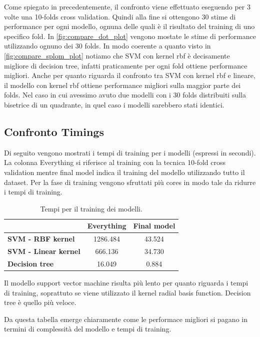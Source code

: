 Come spiegato in precedentemente, il confronto viene effettuato
eseguendo per 3 volte una 10-folds cross validation. Quindi alla fine
si ottengono 30 stime di performance per ogni modello, ognuna delle
quali è il risultato del training di uno specifico fold. In
\autoref{fig:compare_dot_plot} vengono mostate le stime di performance
utilizzando ognuno dei 30 folds. In modo coerente a quanto visto in
\autoref{fig:compare_splom_plot} notiamo che SVM con kernel rbf è
decisamente migliore di decision tree, infatti praticamente per ogni
fold ottiene performance migliori. Anche per quanto riguarda il
confronto tra SVM con kernel rbf e lineare, il modello con kernel rbf
ottiene performance migliori sulla maggior parte dei folds. Nel caso
in cui avessimo avuto due modelli con i 30 folds distribuiti sulla
bisetrice di un quadrante, in quel caso i modelli sarebbero stati
identici.

\subsection{Confronto Timings}
Di seguito vengono mostrati i tempi di training per i modelli
(espressi in secondi).  La colonna Everything si riferisce al training
con la tecnica 10-fold cross validation mentre final model indica il
training del modello utilizzando tutto il dataset. Per la fase di
training vengono sfruttati più cores in modo tale da ridurre i tempi
di training.

\begin{table}[H]
	\begin{center}
		\begin{tabular}{ | l | c | c |}
			\hline
			& \textbf{Everything} & \textbf{Final model} \\
			\hline
			\textbf{SVM - RBF kernel} & 1286.484  & 43.524 \\
			\textbf{SVM - Linear kernel} & 666.136 & 34.730 \\
			\textbf{Decision tree} & 16.049 & 0.884  \\
			\hline
		\end{tabular}
	\end{center}
	\caption{Tempi per il training dei modelli.}
\end{table}

Il modello support vector machine
risulta più lento per quanto riguarda i tempi di training, soprattuto
se viene utilizzato il kernel radial basis function. Decision tree è
quello più veloce.

Da questa tabella emerge chiaramente come le performace migliori si pagano in termini di complessità del modello e tempi di training.
